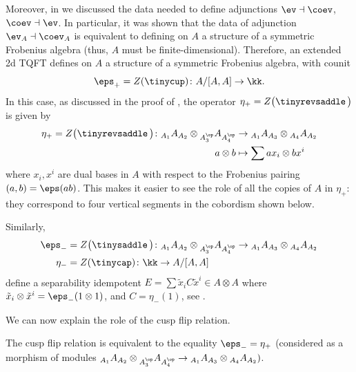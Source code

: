 Moreover, in  we discussed the data needed to define adjunctions
$\ev\dashv\coev$, $\coev\dashv\ev$. In particular, it was shown that the data of
adjunction $\ev_A\dashv\coev_A$ is equivalent to defining on $A$ a structure of
a symmetric Frobenius algebra (thus, $A$ must be finite-dimensional). Therefore,
an extended 2d TQFT defines on $A$ a structure of a symmetric Frobenius algebra,
with counit
$$
\eps_+ = Z(\tinycup)\colon A/[A,A]\to \kk.
$$
In this case, as discussed in the proof of , the
operator $\eta_+ = Z\bigl(\tinyrevsaddle \,\bigr)$ is given by
\begin{align*}
  \eta_+ = Z\bigl(\tinyrevsaddle \,\bigr)\colon
        {}_{A_1} A_{A_2}\otimes {}_{A^\op_3}A_{A^\op_4}
        &\to   {}_{A_1} A_{A_3}\otimes {}_{A_4}A_{A_2}\\
        a\otimes b&\mapsto \sum a x_i\otimes b x^i
\end{align*}
where $x_i, x^i$ are dual bases in $A$ with respect to the Frobenius pairing
$(a,b)=\eps(ab)$. This makes it easier to see the role of all the copies of
$A$ in $\eta_+$: they correspond to four vertical segments in the cobordism
shown below.
\begin{center}
\end{center}



Similarly,
\begin{align*}
  \eps_-  &= Z\bigl(\tinysaddle\, \bigr)\colon
          {}_{A_1} A_{A_2}\otimes {}_{A^\op_3}A_{A^\op_4}
          \to   {}_{A_1} A_{A_3}\otimes {}_{A_4}A_{A_2}\\
  \eta_-  &= Z(\tinycap)\colon \kk\to A/[A,A]
\end{align*}
define a separability idempotent $E=\sum \tilde x_i C \tilde x^i\in A\otimes A$
where $\tilde x_i\otimes \tilde x^i=\eps_-(1\otimes 1)$, and $C=\eta_-(1)$,
see .

We can now explain the role of the cusp flip relation.
\begin{lemma}\label{l:cusp-flip}
  The cusp flip relation is equivalent to the equality $\eps_-=\eta_+$
  \textup{(}considered as a morphism of modules
  ${}_{A_1} A_{A_2}\otimes {}_{A^\op_3}A_{A^\op_4}
    \to   {}_{A_1} A_{A_3}\otimes {}_{A_4}A_{A_2})$.
\end{lemma}




